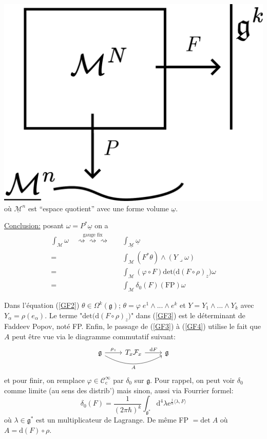 \documentclass[a4paper,11pt]{article}
\renewcommand{\d}{{\mathrm{d}}}
\newcommand{\e}{{\mathrm{e}}}
\begin{document}
\begin{center}
	\includegraphics[width=.3\textwidth]{Drawings/Draw_2.pdf}\\
	où $\underline{\mathcal{M}}^n$ est ``espace quotient'' avec une forme volume $\underline{\omega}$.
\end{center}

\noindent \underline{Conclusion:} posant $\omega = P^* \underline{\omega}$ on a
\begin{align}
\int_\mathcal{M} \omega \quad \overset{\mathrm{gauge}\;\mathrm{fix}}{\rightsquigarrow\rightsquigarrow\rightsquigarrow}
\quad & \int_{\underline{\mathcal{M}}} \underline{\omega}\\
=& \int_\mathcal{M} (F^* \theta) \wedge (Y\lrcorner \omega)\label{GF2}\\
=& \int_\mathcal{M} (\varphi\circ F) \mathrm{det} \Big( \d (F\circ\rho)_z\Big) \omega\label{GF3}\\
=& \int_\mathcal{M} \delta_0 (F) (\mathrm{FP}) \omega \label{GF4}
\end{align}

Dans l'équation (\ref{GF2}) $\theta \in \Omega^k(\mathfrak{g})$; $\theta=\varphi\; e^1\wedge...\wedge e^k$ et $Y= Y_1 \wedge ... \wedge Y_k$ avec $Y_\alpha = \rho(e_\alpha)$. Le terme "$\mathrm{det} \Big(\d (F\circ\rho)_z\Big)$" dans (\ref{GF3}) est le déterminant de Faddeev Popov, noté FP. Enfin, le passage de (\ref{GF3}) à (\ref{GF4}) utilise le fait que $A$ peut être vue via le diagramme commutatif suivant:
$$\begin{tikzcd}
\mathfrak{g}\arrow[r, "\rho_z"]\arrow[rr,"A",bend right=30,swap] & T_x\mathcal{F}_x \arrow[r,"\d F"] & \mathfrak{g}
\end{tikzcd}$$
et pour finir, on remplace $\varphi \in \mathcal{C}^\infty_\mathrm{c}$ par $\delta_0$ sur $\mathfrak{g}$. Pour rappel, on peut voir $\delta_0$ comme limite (au sens des distrib') mais sinon, aussi via Fourrier formel:
$$\delta_0(F) = \frac{1}{(2\pi\hbar)^k}\int_{\mathfrak{g}^*} \d^4\lambda \e^{\frac{i}{\hbar}\langle\lambda,F\rangle}$$
où $\lambda \in \mathfrak{g}^*$ est un multiplicateur de Lagrange. De même FP $= \mathrm{det} \; A$ où $A=\d (F)\circ \rho$.\\
\end{document}
